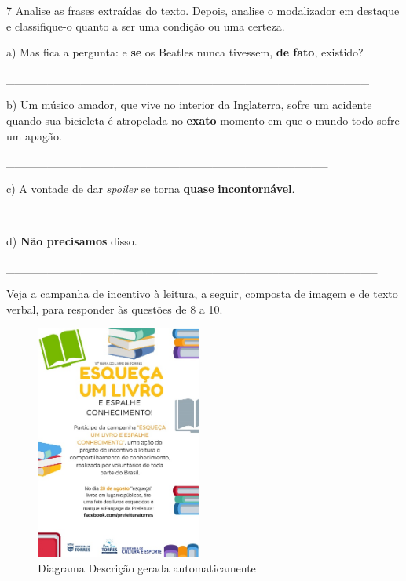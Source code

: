 
\num{7} Analise as frases extraídas do texto. Depois, analise o
modalizador em destaque e classifique-o quanto a ser uma condição ou uma
certeza.

a) Mas fica a pergunta: e \textbf{{se}} os Beatles nunca tivessem,
\textbf{{de fato}}, existido?

\_\_\_\_\_\_\_\_\_\_\_\_\_\_\_\_\_\_\_\_\_\_\_\_\_\_\_\_\_\_\_\_\_\_\_\_\_\_\_\_\_\_\_\_

b) Um músico amador, que vive no interior da Inglaterra, sofre um
acidente quando sua bicicleta é atropelada no \textbf{{exato}} momento
em que o mundo todo sofre um apagão.

\_\_\_\_\_\_\_\_\_\_\_\_\_\_\_\_\_\_\_\_\_\_\_\_\_\_\_\_\_\_\_\_\_\_\_\_\_\_\_

c) A vontade de dar \emph{spoiler} se torna \textbf{{quase}}
\textbf{{incontornável}}.

\_\_\_\_\_\_\_\_\_\_\_\_\_\_\_\_\_\_\_\_\_\_\_\_\_\_\_\_\_\_\_\_\_\_\_\_\_\_

d) \textbf{{Não precisamos}} disso.

\_\_\_\_\_\_\_\_\_\_\_\_\_\_\_\_\_\_\_\_\_\_\_\_\_\_\_\_\_\_\_\_\_\_\_\_\_\_\_\_\_\_\_\_\_


Veja a campanha de incentivo à leitura, a seguir, composta de imagem e
de texto verbal, para responder às questões de 8 a 10.

\begin{figure}
\centering
\includegraphics[width=2.14842in,height=3.03846in]{./imgSAEB_6_POR/media/image25.jpeg}
\caption{Diagrama Descrição gerada automaticamente}
\end{figure}

